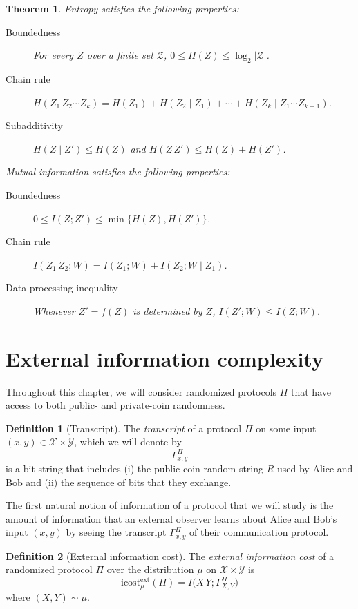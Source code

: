 \documentclass[11pt]{amsart}
\theoremstyle{plain}
\newtheorem{theorem}{Theorem}
\theoremstyle{definition}
\newtheorem{definition}{Definition}
\theoremstyle{plain}
\newcommand{\calX}{\mathcal{X}}
\newcommand{\calY}{\mathcal{Y}}
\newcommand{\calZ}{\mathcal{Z}}
\newcommand{\icostext}{\mathrm{icost}^{\mathrm{ext}}}
\begin{document}
\begin{theorem}
Entropy satisfies the following properties:
\begin{description}
\item[Boundedness] For every $Z$ over a finite set $\calZ$, $0 \le H(Z) \le \log_2 |\calZ|$.
\item[Chain rule] $H(Z_1\,Z_2\cdots Z_k) = H(Z_1) + H(Z_2 \mid Z_1) + \cdots + H(Z_k \mid Z_1\cdots Z_{k-1})$.
\item[Subadditivity] $H(Z \mid Z') \le H(Z)$ and $H(Z\,Z') \le H(Z) + H(Z')$.
\end{description}
Mutual information satisfies the following properties:
\begin{description}
\item[Boundedness] $0 \le I(Z ; Z') \le \min\{ H(Z), H(Z') \}$.
\item[Chain rule] $I(Z_1\,Z_2 ; W) = I(Z_1 ; W) + I(Z_2 ; W \mid Z_1)$.
\item[Data processing inequality] Whenever $Z' = f(Z)$ is determined by $Z$, $I(Z' ; W) \le I(Z ; W)$.
\end{description}

\end{theorem}



\newpage 
\section{External information complexity}

Throughout this chapter, we will consider randomized protocols $\Pi$ that have access to both public- and private-coin randomness. 

\begin{definition}[Transcript]
The \emph{transcript} of a protocol $\Pi$ on some input $(x,y) \in \calX \times \calY$, which we will denote by
\[
\Gamma_{x,y}^\Pi
\]
is a bit string that includes (i) the public-coin random string $R$ used by Alice and Bob and (ii) the sequence of bits that they exchange. 
\end{definition}

The first natural notion of information of a protocol that we will study is the amount of information that an external observer learns about Alice and Bob's input $(x,y)$ by seeing the transcript $\Gamma_{x,y}^\Pi$ of their communication protocol.

\begin{definition}[External information cost]
The \emph{external information cost} of a randomized protocol $\Pi$ over the distribution $\mu$ on $\calX \times \calY$ is
\[
\icostext_\mu(\Pi) = I\big( X\,Y ; \Gamma_{X,Y}^\Pi \big)
\]
where $(X,Y) \sim \mu$.
\end{definition}
\end{document}
